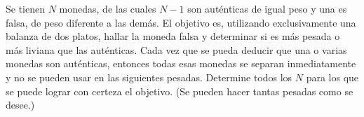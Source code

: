 Se tienen $N$ monedas, de las cuales $N-1$ son auténticas de igual peso y una es falsa, de peso diferente a las demás. El objetivo es, utilizando exclusivamente una balanza de dos platos, hallar la moneda falsa y determinar si es más pesada o más liviana que las auténticas. Cada vez que se pueda deducir que una o varias monedas son auténticas, entonces todas esas monedas se separan inmediatamente y no se pueden usar en las siguientes pesadas. Determine todos los $N$ para los que se puede lograr con certeza el objetivo. (Se pueden hacer tantas pesadas como se desee.)
